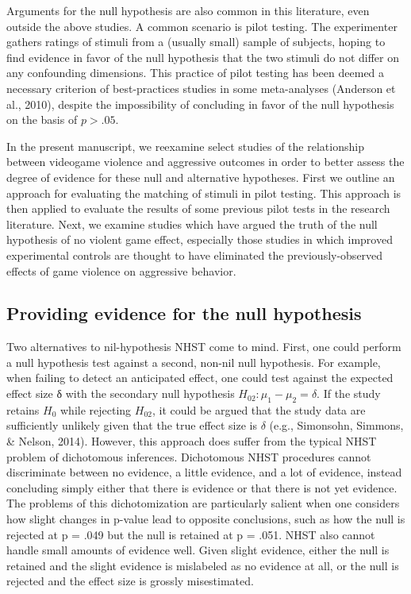 \documentclass[fignum,nobf,man]{apa}
\begin{document}
Arguments for the null hypothesis are also common in this literature, even outside the above studies. A common scenario is pilot testing. The experimenter gathers ratings of stimuli from a (usually small) sample of subjects, hoping to find evidence in favor of the null hypothesis that the two stimuli do not differ on any confounding dimensions. This practice of pilot testing has been deemed a necessary criterion of best-practices studies in some meta-analyses (Anderson et al., 2010), despite the impossibility of concluding in favor of the null hypothesis on the basis of $p > .05$.

In the present manuscript, we reexamine select studies of the relationship between videogame violence and aggressive outcomes in order to better assess the degree of evidence for these null and alternative hypotheses. First we outline an approach for evaluating the matching of stimuli in pilot testing. This approach is then applied to evaluate the results of some previous pilot tests in the research literature. Next, we examine studies which have argued the truth of the null hypothesis of no violent game effect, especially those studies in which improved experimental controls are thought to have eliminated the previously-observed effects of game violence on aggressive behavior. 

\subsection{Providing evidence for the null hypothesis}
Two alternatives to nil-hypothesis NHST come to mind. First, one could perform a null hypothesis test against a second, non-nil null hypothesis. For example, when failing to detect an anticipated effect, one could test against the expected effect size δ with the secondary null hypothesis $H_{02}: \mu_1 - \mu_2 = \delta$. If the study retains $H_0$ while rejecting $H_{02}$, it could be argued that the study data are sufficiently unlikely given that the true effect size is $\delta$ (e.g., Simonsohn, Simmons, \& Nelson, 2014). However, this approach does suffer from the typical NHST problem of dichotomous inferences. Dichotomous NHST procedures cannot discriminate between no evidence, a little evidence, and a lot of evidence, instead concluding simply either that there is evidence or that there is not yet evidence. The problems of this dichotomization are particularly salient when one considers how slight changes in p-value lead to opposite conclusions, such as how the null is rejected at p = .049 but the null is retained at p = .051. NHST also cannot handle small amounts of evidence well. Given slight evidence, either the null is retained and the slight evidence is mislabeled as no evidence at all, or the null is rejected and the effect size is grossly misestimated. 
\end{document}
